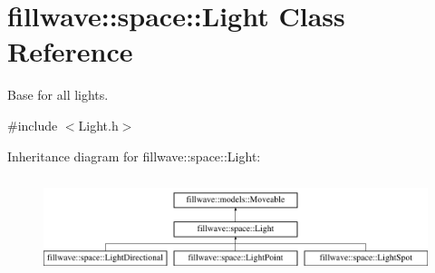 \hypertarget{classfillwave_1_1space_1_1Light}{}\section{fillwave\+:\+:space\+:\+:Light Class Reference}
\label{classfillwave_1_1space_1_1Light}


Base for all lights.  




{\ttfamily \#include $<$Light.\+h$>$}

Inheritance diagram for fillwave\+:\+:space\+:\+:Light\+:\begin{figure}[H]
\begin{center}
\leavevmode
\includegraphics[height=2.842640cm]{classfillwave_1_1space_1_1Light}
\end{center}
\end{figure}
